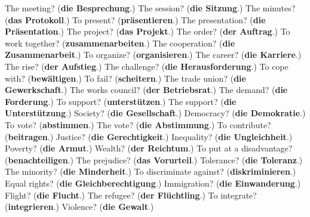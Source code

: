\begin{tcolorbox}[breakable,colback=teal!4,colframe=teal!35!black,title={Before you move on}]
The meeting? (\textbf{die Besprechung}.) The session? (\textbf{die Sitzung}.) The minutes? (\textbf{das Protokoll}.) To present? (\textbf{präsentieren}.) The presentation? (\textbf{die Präsentation}.) The project? (\textbf{das Projekt}.) The order? (\textbf{der Auftrag}.) To work together? (\textbf{zusammenarbeiten}.) The cooperation? (\textbf{die Zusammenarbeit}.) To organize? (\textbf{organisieren}.) The career? (\textbf{die Karriere}.) The rise? (\textbf{der Aufstieg}.) The challenge? (\textbf{die Herausforderung}.) To cope with? (\textbf{bewältigen}.) To fail? (\textbf{scheitern}.) The trade union? (\textbf{die Gewerkschaft}.) The works council? (\textbf{der Betriebsrat}.) The demand? (\textbf{die Forderung}.) To support? (\textbf{unterstützen}.) The support? (\textbf{die Unterstützung}.) Society? (\textbf{die Gesellschaft}.) Democracy? (\textbf{die Demokratie}.) To vote? (\textbf{abstimmen}.) The vote? (\textbf{die Abstimmung}.) To contribute? (\textbf{beitragen}.) Justice? (\textbf{die Gerechtigkeit}.) Inequality? (\textbf{die Ungleichheit}.) Poverty? (\textbf{die Armut}.) Wealth? (\textbf{der Reichtum}.) To put at a disadvantage? (\textbf{benachteiligen}.) The prejudice? (\textbf{das Vorurteil}.) Tolerance? (\textbf{die Toleranz}.) The minority? (\textbf{die Minderheit}.) To discriminate against? (\textbf{diskriminieren}.) Equal rights? (\textbf{die Gleichberechtigung}.) Immigration? (\textbf{die Einwanderung}.) Flight? (\textbf{die Flucht}.) The refugee? (\textbf{der Flüchtling}.) To integrate? (\textbf{integrieren}.) Violence? (\textbf{die Gewalt}.)
\end{tcolorbox}
